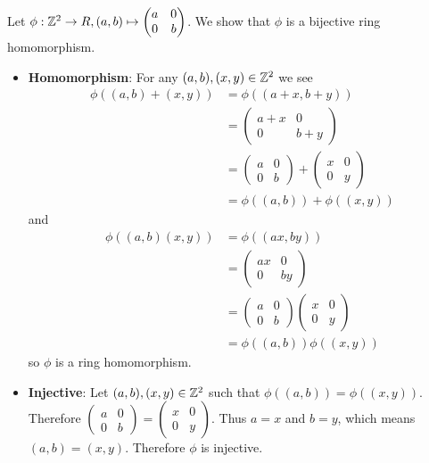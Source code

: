 \begin{questions}
    \item Let $\phi: \mathbb{Z}^2 \to R, (a,b)\mapsto \begin{pmatrix}a&0\\0&b\end{pmatrix}$. We show that $\phi$ is a bijective ring homomorphism.
    \begin{itemize}
        \item \textbf{Homomorphism}: For any $(a, b), (x, y) \in \mathbb{Z}^2$ we see
        \begin{align*}
            \phi((a,b) + (x,y)) &= \phi((a+x,b+y))\\
            &= \begin{pmatrix}a+x&0\\0&b+y\end{pmatrix}\\
            &= \begin{pmatrix}a&0\\0&b\end{pmatrix} + \begin{pmatrix}x&0\\0&y\end{pmatrix}\\
            &= \phi((a,b)) + \phi((x,y))
        \end{align*}
        and
        \begin{align*}
            \phi((a,b)(x,y)) &= \phi((ax,by))\\
            &= \begin{pmatrix}ax&0\\0&by\end{pmatrix}\\
            &= \begin{pmatrix}a&0\\0&b\end{pmatrix}\begin{pmatrix}x&0\\0&y\end{pmatrix}\\
            &= \phi((a,b))\phi((x,y))
        \end{align*}
        so $\phi$ is a ring homomorphism.

        \item \textbf{Injective}: Let $(a, b), (x, y) \in \mathbb{Z}^2$ such that $\phi((a,b)) = \phi((x,y))$. Therefore $\begin{pmatrix}a&0\\0&b\end{pmatrix} = \begin{pmatrix}x&0\\0&y\end{pmatrix}$. Thus $a = x$ and $b = y$, which means $(a,b) = (x,y)$. Therefore $\phi$ is injective.


\end{itemize}
\end{questions}
